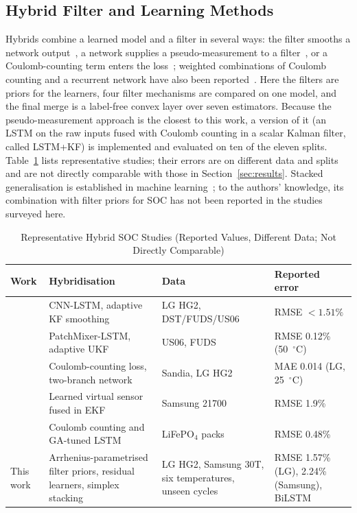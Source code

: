 \documentclass[journal]{IEEEtran}
\begin{document}
\subsection{Hybrid Filter and Learning Methods}
Hybrids combine a learned model and a filter in several ways: the filter smooths a network output~\cite{xu2025processes,jiang2025energy}, a network supplies a pseudo-measurement to a filter~\cite{previtali2025iecon}, or a Coulomb-counting term enters the loss~\cite{pollo2025date}; weighted combinations of Coulomb counting and a recurrent network have also been reported~\cite{carrera2025sensors}. Here the filters are priors for the learners, four filter mechanisms are compared on one model, and the final merge is a label-free convex layer over seven estimators. Because the pseudo-measurement approach is the closest to this work, a version of it (an LSTM on the raw inputs fused with Coulomb counting in a scalar Kalman filter, called LSTM+KF) is implemented and evaluated on ten of the eleven splits. Table~\ref{tab:related} lists representative studies; their errors are on different data and splits and are not directly comparable with those in Section~\ref{sec:results}. Stacked generalisation is established in machine learning~\cite{wolpert1992stacked,breiman1996stacked}; to the authors' knowledge, its combination with filter priors for SOC has not been reported in the studies surveyed here.

\begin{table}[!t]
\caption{Representative Hybrid SOC Studies (Reported Values, Different Data; Not Directly Comparable)}
\label{tab:related}
\centering
\footnotesize
\setlength{\tabcolsep}{3pt}
\begin{tabular}{p{1.1cm}p{3.0cm}p{2.1cm}p{1.6cm}}
\toprule
Work & Hybridisation & Data & Reported error\\
\midrule
\cite{xu2025processes} & CNN-LSTM, adaptive KF smoothing & LG HG2, DST/FUDS/US06 & RMSE $<1.51\%$\\
\cite{jiang2025energy} & PatchMixer-LSTM, adaptive UKF & US06, FUDS & RMSE 0.12\% (50~$^\circ$C)\\
\cite{pollo2025date} & Coulomb-counting loss, two-branch network & Sandia, LG HG2 & MAE 0.014 (LG, 25~$^\circ$C)\\
\cite{previtali2025iecon} & Learned virtual sensor fused in EKF & Samsung 21700 & RMSE 1.9\%\\
\cite{carrera2025sensors} & Coulomb counting and GA-tuned LSTM & LiFePO$_4$ packs & RMSE 0.48\%\\
This work & Arrhenius-parametrised filter priors, residual learners, simplex stacking & LG HG2, Samsung 30T, six temperatures, unseen cycles & RMSE 1.57\% (LG), 2.24\% (Samsung), BiLSTM\\
\bottomrule
\end{tabular}
\end{table}
\end{document}

